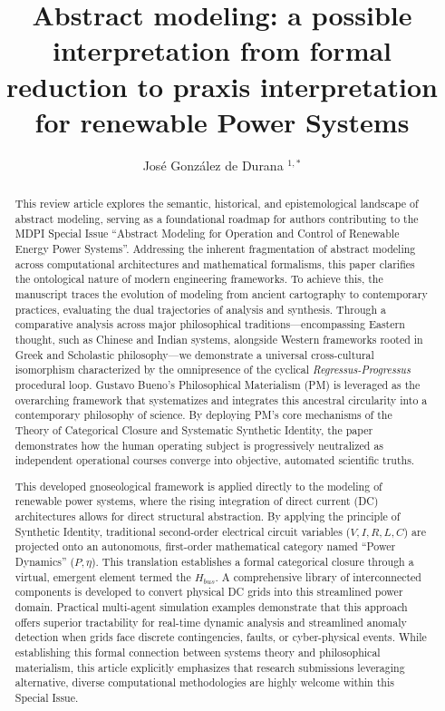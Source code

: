 \documentclass[11pt, a4paper]{article}
\title{Abstract modeling: a possible interpretation from formal reduction to praxis interpretation for renewable Power Systems}
\author{José González de Durana $^{1,*}$}
\begin{document}
\maketitle

\begin{abstract}
This review article explores the semantic, historical, and epistemological landscape of abstract modeling, serving as a foundational roadmap for authors contributing to the MDPI Special Issue ``Abstract Modeling for Operation and Control of Renewable Energy Power Systems''. Addressing the inherent fragmentation of abstract modeling across computational architectures and mathematical formalisms, this paper clarifies the ontological nature of modern engineering frameworks. To achieve this, the manuscript traces the evolution of modeling from ancient cartography to contemporary practices, evaluating the dual trajectories of analysis and synthesis. Through a comparative analysis across major philosophical traditions—encompassing Eastern thought, such as Chinese and Indian systems, alongside Western frameworks rooted in Greek and Scholastic philosophy—we demonstrate a universal cross-cultural isomorphism characterized by the omnipresence of the cyclical \textit{Regressus-Progressus} procedural loop. Gustavo Bueno’s Philosophical Materialism (PM) is leveraged as the overarching framework that systematizes and integrates this ancestral circularity into a contemporary philosophy of science. By deploying PM's core mechanisms of the Theory of Categorical Closure and Systematic Synthetic Identity, the paper demonstrates how the human operating subject is progressively neutralized as independent operational courses converge into objective, automated scientific truths.

This developed gnoseological framework is applied directly to the modeling of renewable power systems, where the rising integration of direct current (DC) architectures allows for direct structural abstraction. By applying the principle of Synthetic Identity, traditional second-order electrical circuit variables ($V, I, R, L, C$) are projected onto an autonomous, first-order mathematical category named ``Power Dynamics'' ($P, \eta$). This translation establishes a formal categorical closure through a virtual, emergent element termed the $H_{bus}$. A comprehensive library of interconnected components is developed to convert physical DC grids into this streamlined power domain. Practical multi-agent simulation examples demonstrate that this approach offers superior tractability for real-time dynamic analysis and streamlined anomaly detection when grids face discrete contingencies, faults, or cyber-physical events. While establishing this formal connection between systems theory and philosophical materialism, this article explicitly emphasizes that research submissions leveraging alternative, diverse computational methodologies are highly welcome within this Special Issue.


\end{abstract}
\end{document}
